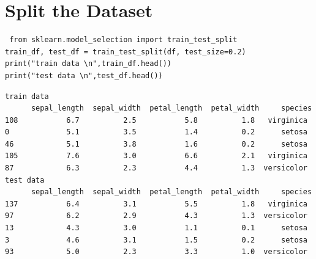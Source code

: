 \section{ Split the Dataset}
\vspace{-.75cm}
\begin{code}
\begin{lstlisting}
 from sklearn.model_selection import train_test_split
train_df, test_df = train_test_split(df, test_size=0.2)
print("train data \n",train_df.head())
print("test data \n",test_df.head())
\end{lstlisting}
\end{code}
\vspace{-1cm}
\begin{verbatim}
train data 
      sepal_length  sepal_width  petal_length  petal_width     species
108           6.7          2.5           5.8          1.8   virginica
0             5.1          3.5           1.4          0.2      setosa
46            5.1          3.8           1.6          0.2      setosa
105           7.6          3.0           6.6          2.1   virginica
87            6.3          2.3           4.4          1.3  versicolor
test data 
      sepal_length  sepal_width  petal_length  petal_width     species
137           6.4          3.1           5.5          1.8   virginica
97            6.2          2.9           4.3          1.3  versicolor
13            4.3          3.0           1.1          0.1      setosa
3             4.6          3.1           1.5          0.2      setosa
93            5.0          2.3           3.3          1.0  versicolor
\end{verbatim}

\vspace{-.3cm}
